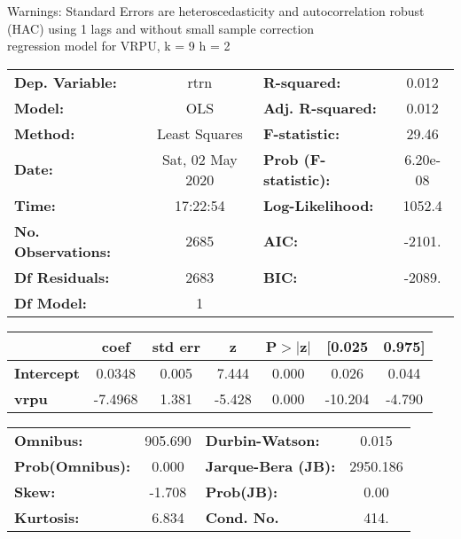 Warnings: \newline
 [1] Standard Errors are heteroscedasticity and autocorrelation robust (HAC) using 1 lags and without small sample correction\\ 

regression model for VRPU, k = 9 h = 2\begin{center}
\begin{tabular}{lclc}
\toprule
\textbf{Dep. Variable:}    &       rtrn       & \textbf{  R-squared:         } &     0.012   \\
\textbf{Model:}            &       OLS        & \textbf{  Adj. R-squared:    } &     0.012   \\
\textbf{Method:}           &  Least Squares   & \textbf{  F-statistic:       } &     29.46   \\
\textbf{Date:}             & Sat, 02 May 2020 & \textbf{  Prob (F-statistic):} &  6.20e-08   \\
\textbf{Time:}             &     17:22:54     & \textbf{  Log-Likelihood:    } &    1052.4   \\
\textbf{No. Observations:} &        2685      & \textbf{  AIC:               } &    -2101.   \\
\textbf{Df Residuals:}     &        2683      & \textbf{  BIC:               } &    -2089.   \\
\textbf{Df Model:}         &           1      & \textbf{                     } &             \\
\bottomrule
\end{tabular}
\begin{tabular}{lcccccc}
                   & \textbf{coef} & \textbf{std err} & \textbf{z} & \textbf{P$> |$z$|$} & \textbf{[0.025} & \textbf{0.975]}  \\
\midrule
\textbf{Intercept} &       0.0348  &        0.005     &     7.444  &         0.000        &        0.026    &        0.044     \\
\textbf{vrpu}      &      -7.4968  &        1.381     &    -5.428  &         0.000        &      -10.204    &       -4.790     \\
\bottomrule
\end{tabular}
\begin{tabular}{lclc}
\textbf{Omnibus:}       & 905.690 & \textbf{  Durbin-Watson:     } &    0.015  \\
\textbf{Prob(Omnibus):} &   0.000 & \textbf{  Jarque-Bera (JB):  } & 2950.186  \\
\textbf{Skew:}          &  -1.708 & \textbf{  Prob(JB):          } &     0.00  \\
\textbf{Kurtosis:}      &   6.834 & \textbf{  Cond. No.          } &     414.  \\
\bottomrule
\end{tabular}
\end{center}

